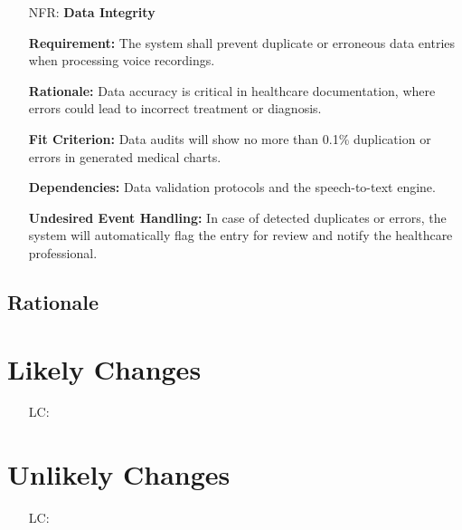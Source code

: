 \documentclass[12pt]{article}
\newcounter{nfrnum} %
\newcounter{lcnum} %
\begin{document}
\begin{itemize}
\item[NFR\refstepcounter{nfrnum}\thenfrnum \label{NFR_DataIntegrity}:] \textbf{Data Integrity}  

    \textbf{Requirement:} The system shall prevent duplicate or erroneous data entries when processing voice recordings.  
  
    \textbf{Rationale:} Data accuracy is critical in healthcare documentation, where errors could lead to incorrect treatment or diagnosis.  
  
    \textbf{Fit Criterion:} Data audits will show no more than 0.1\% duplication or errors in generated medical charts.  
  
    \textbf{Dependencies:} Data validation protocols and the speech-to-text engine.  
  
    \textbf{Undesired Event Handling:} In case of detected duplicates or errors, the system will automatically flag the entry for review and notify the healthcare professional.

\end{itemize}

\subsection{Rationale}


\section{Likely Changes}    

\noindent \begin{itemize}

\item[LC\refstepcounter{lcnum}\thelcnum\label{LC_meaningfulLabel}:] 

\end{itemize}

\section{Unlikely Changes}    

\noindent \begin{itemize}

\item[LC\refstepcounter{lcnum}\thelcnum\label{LC_meaningfulLabel}:] 

\end{itemize}
\end{document}

